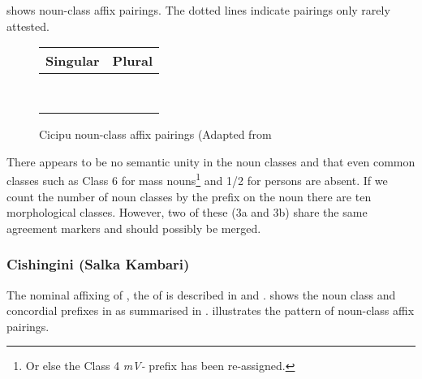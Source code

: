 \documentclass[output=paper]{langsci/langscibook}
\begin{document}
  
 shows  noun-class affix pairings. The dotted lines indicate pairings only rarely attested.

\begin{figure}
\begin{tabular}{Z{3cm}@{\qquad}Z{3cm}}
 {Singular}	  	& {Plural}\\
 \midrule
{} 	 	&  \\
\tablevspace
{} 	 	& \\ 
\tablevspace
{} 	& \\
\tablevspace
{} 		&   \\
\tablevspace
{}& \\
\tablevspace
{} 		& \\
\tablevspace
{} 	&   \\
\tablevspace
{} 	& \\
\end{tabular}

 
\caption{\label{fig:kainji:5} Cicipu noun-class affix pairings (Adapted from \citet{McGill2009}}
\end{figure}


There appears to be no semantic unity in the noun classes and that even common  classes such as Class 6 for mass nouns\footnote{Or else the Class 4 \textit{mV-} prefix has been re-assigned.} and 1/2 for persons are absent. If we count the number of noun classes by the prefix on the noun there are ten morphological classes. However, two of these (3a and 3b) share the same agreement markers and should possibly be merged.

\subsubsection{Cishingini (Salka Kambari)}


The nominal affixing of , the  of  is described in \citet{Hoffmann1963} and \citet{Crozier1984}.  shows the {noun class and concordial prefixes in  as summarised in \citet{Crozier1984}.}  illustrates the pattern of  noun-class affix pairings.
\end{document}
